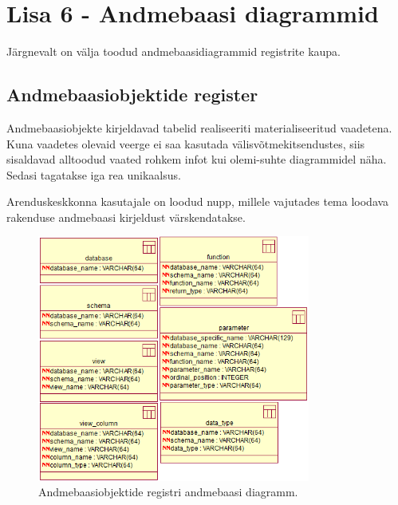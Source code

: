 \documentclass[a4paper,12pt]{article} %
\begin{document}
\pagebreak

\section*{Lisa 6 - Andmebaasi diagrammid}
\label{lisa_andmebaasi_diagrammid}
Järgnevalt on välja toodud andmebaasidiagrammid registrite kaupa.

\subsection*{Andmebaasiobjektide register}
Andmebaasiobjekte kirjeldavad tabelid realiseeriti materialiseeritud vaadetena. Kuna vaadetes olevaid veerge ei saa kasutada välisvõtmekitsendustes, siis sisaldavad alltoodud vaated rohkem infot kui olemi-suhte diagrammidel näha. Sedasi tagatakse iga rea unikaalsus.\par
Arenduskeskkonna kasutajale on loodud nupp, millele vajutades tema loodava rakenduse andmebaasi kirjeldust värskendatakse.
\begin{figure}[H]
\centering
\includegraphics[width=0.8\textwidth]{./diagrams/database-object-db-diagram.png}
\caption{Andmebaasiobjektide registri andmebaasi diagramm.}
\label{fig_andmebaasiobjektide_registri_andmebaasi_diagramm}
\end{figure}
\end{document}
